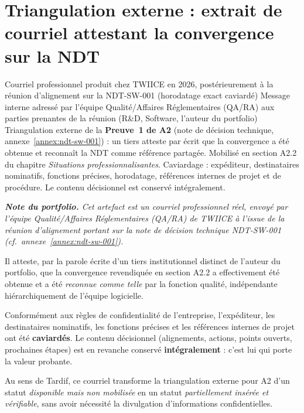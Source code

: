 
\chapter{Triangulation externe : extrait de courriel attestant la convergence sur la NDT}
\label{annex:triangulation-a2-mail}

\annexefiche
  {Courriel professionnel produit chez TWIICE en 2026, postérieurement à la réunion d'alignement sur la NDT-SW-001 (horodatage exact caviardé)}
  {Message interne adressé par l'équipe Qualité/Affaires Réglementaires (QA/RA) aux parties prenantes de la réunion (R\&D, Software, l'auteur du portfolio)}
  {Triangulation externe de la \textbf{Preuve~1 de A2} (note de décision technique, annexe~\ref{annex:ndt-sw-001}) : un tiers atteste par écrit que la convergence a été obtenue et reconnaît la NDT comme référence partagée. Mobilisé en section A2.2 du chapitre \textit{Situations professionnalisantes}.}
  {Caviardage : expéditeur, destinataires nominatifs, fonctions précises, horodatage, références internes de projet et de procédure. Le contenu décisionnel est conservé intégralement.}

\begin{tcolorbox}[colback=blue!5, colframe=blue!40!black, boxrule=0.5pt, arc=3pt,
  left=8pt, right=8pt, top=6pt, bottom=6pt]
  \small\itshape
  \textbf{Note du portfolio.} Cet artefact est un courriel professionnel réel,
  envoyé par l'équipe Qualité/Affaires Réglementaires (QA/RA) de TWIICE à
  l'issue de la réunion d'alignement portant sur la note de décision technique
  NDT-SW-001 (cf.~annexe~\ref{annex:ndt-sw-001}).

  Il atteste, par la parole écrite d'un tiers institutionnel distinct de
  l'auteur du portfolio, que la convergence revendiquée en section A2.2 a
  effectivement été obtenue et a été \emph{reconnue comme telle} par la
  fonction qualité, indépendante hiérarchiquement de l'équipe logicielle.

  Conformément aux règles de confidentialité de l'entreprise, l'expéditeur,
  les destinataires nominatifs, les fonctions précises et les références
  internes de projet ont été \textbf{caviardés}. Le contenu décisionnel
  (alignements, actions, points ouverts, prochaines étapes) est en revanche
  conservé \textbf{intégralement} : c'est lui qui porte la valeur probante.

  Au sens de Tardif, ce courriel transforme la triangulation externe pour A2
  d'un statut \emph{disponible mais non mobilisée} en un statut
  \emph{partiellement insérée et vérifiable}, sans avoir nécessité la
  divulgation d'informations confidentielles.
\end{tcolorbox}

